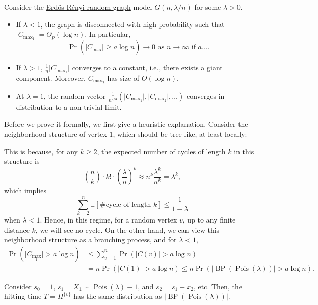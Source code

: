 \begin{theorem}
	Consider the \hyperref[def:Erdős-Rényi-random-graph]{Erdős-Rényi random graph} model \(G(n, \lambda / n)\) for some \(\lambda > 0\).
	\begin{itemize}
		\item If \(\lambda < 1\), the graph is disconnected with high probability such that \(\lvert C_{\max _1} \rvert = \Theta _p (\log n)\). In particular,
		      \[
			      \Pr_{}\left( \lvert C_{\max _1} \rvert \geq  a \log n \right)
			      \to 0 \text{ as } n \to \infty \text{ if } a \dots .
		      \]
		\item If \(\lambda > 1\), \(\frac{1}{n} \lvert C_{\max _1} \rvert \) converges to a constant, i.e., there exists a giant component. Moreover, \(C_{\max _2}\) has size of \(O(\log n)\).
		\item At \(\lambda = 1\), the random vector \(\frac{1}{n^{2 / 3}} (\lvert C_{\max _1} \rvert , \lvert C_{\max _2} \rvert , \dots )\) converges in distribution to a non-trivial limit.
	\end{itemize}
\end{theorem}

Before we prove it formally, we first give a heuristic explanation. Consider the neighborhood structure of vertex \(1\), which should be tree-like, at least locally:
\begin{center}
\end{center}
This is because, for any \(k \geq 2\), the expected number of cycles of length \(k\) in this structure is
\[
	\binom{n}{k} \cdot k! \cdot \left( \frac{\lambda}{n} \right) ^k
	\approx n^k \frac{\lambda ^k}{n^k}
	= \lambda ^k,
\]
which implies
\[
	\sum_{k=2}^{n} \mathbb{E}_{}[\# \text{cycle of length } k]
	\leq \frac{1}{1 - \lambda }
\]
when \(\lambda < 1\). Hence, in this regime, for a random vertex \(v\), up to any finite distance \(k\), we will see no cycle. On the other hand, we can view this neighborhood structure as a branching process, and for \(\lambda < 1\),
\[
	\begin{split}
		\Pr_{}\left( \lvert C_{\max _1} \rvert > a \log n \right)
		 & \leq \sum_{v=1}^{n} \Pr_{}(\lvert C(v) \rvert > a \log n) \\
		 & = n \Pr_{}(\lvert C(1) \rvert > a \log n)
		\leq n \Pr_{}(\lvert \operatorname{BP}(\operatorname{Pois}(\lambda ) )  \rvert > a \log n) .
	\end{split}
\]

Consider \(s_0 = 1\), \(s_1 = X_1 \sim \operatorname{Pois}(\lambda ) - 1\), and \(s_2 = s_1 + x_2\), etc. Then, the hitting time \(T = H^{\{ v \} }\) has the same distribution as \(\lvert \operatorname{BP}(\operatorname{Pois}(\lambda ) )  \rvert \).